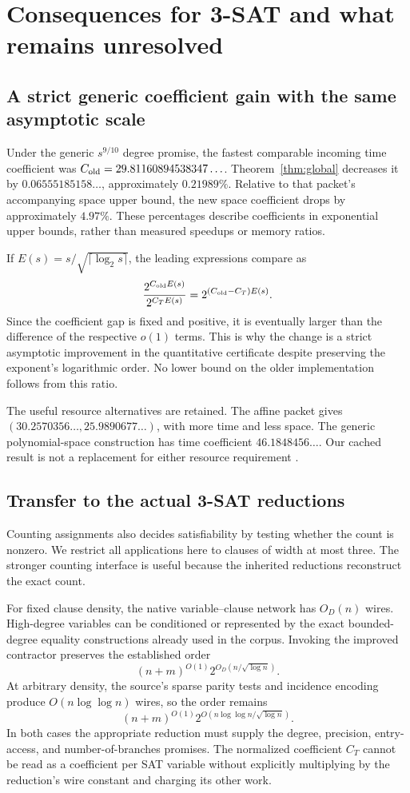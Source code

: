 \section{Consequences for 3-SAT and what remains unresolved}
\label{sec:3sat}

\subsection{A strict generic coefficient gain with the same asymptotic scale}

Under the generic $s^{9/10}$ degree promise, the fastest comparable incoming time coefficient was
$C_{\rm old}=29.81160894538347\ldots$. Theorem~\ref{thm:global} decreases
it by $0.06555185158\ldots$, approximately $0.21989\%$. Relative to that
packet's accompanying space upper bound, the new space coefficient drops
by approximately $4.97\%$. These percentages describe coefficients in
exponential upper bounds, rather than measured speedups or memory ratios.

If $E(s)=s/\sqrt{\lceil\log_2s\rceil}$, the leading expressions compare as
\[
 \frac{2^{C_{\rm old}E(s)}}{2^{C_TE(s)}}
 =2^{(C_{\rm old}-C_T)E(s)}.
\]
Since the coefficient gap is fixed and positive, it is eventually larger
than the difference of the respective $o(1)$ terms. This is why the change
is a strict asymptotic improvement in the quantitative certificate despite
preserving the exponent's logarithmic order. No lower bound on the older
implementation follows from this ratio.

The useful resource alternatives are retained. The affine packet gives
$(30.2570356\ldots,25.9890677\ldots)$, with more time and less space.
The generic polynomial-space construction has time coefficient
$46.1848456\ldots$. Our cached result is not a replacement for either
resource requirement \cite{affine,flags}.

\subsection{Transfer to the actual 3-SAT reductions}

Counting assignments also decides satisfiability by testing whether the
count is nonzero. We restrict all applications here to clauses of width
at most three. The stronger counting interface is useful because the
inherited reductions reconstruct the exact count.

For fixed clause density, the native variable--clause network has
$O_D(n)$ wires. High-degree variables can be conditioned or represented
by the exact bounded-degree equality constructions already used in the
corpus. Invoking the improved contractor preserves the established order
\[
 (n+m)^{O(1)}2^{O_D(n/\sqrt{\log n})}.
\]
At arbitrary density, the source's sparse parity tests and incidence
encoding produce $O(n\log\log n)$ wires, so the order remains
\[
 (n+m)^{O(1)}2^{O(n\log\log n/\sqrt{\log n})}.
\]
In both cases the appropriate reduction must supply the degree, precision,
entry-access, and number-of-branches promises. The normalized coefficient
$C_T$ cannot be read as a coefficient per SAT variable without explicitly
multiplying by the reduction's wire constant and charging its other work.

